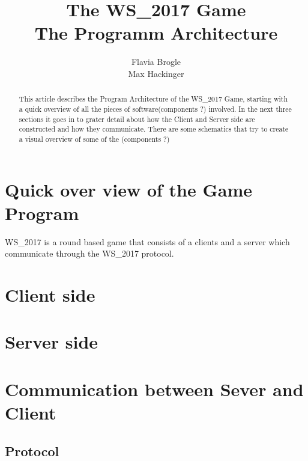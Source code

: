 \documentclass[11pt,a4paper]{article}
\title{The WS\_2017 Game \\ The Programm Architecture}
\author{Flavia Brogle \\ Max Hackinger}
\begin{document}
	\maketitle
  \tableofcontents
  
\begin{abstract}
  This article describes the Program Architecture of the WS\_2017 Game, starting with a quick overview of all the pieces of software(components ?) involved. In the next three sections it goes in to grater detail about how the Client and Server side are constructed and how they communicate. There are some schematics that try to create a visual overview of some of the (components ?) 
\end{abstract}  
  \clearpage
	\section{Quick over view of the Game Program}
	  WS\_2017 is a round based game that consists of a clients and a server which communicate through the WS\_2017 protocol.
		\subsection{}
		\subsection{}
		\subsection{}
	\clearpage
	\section{Client side}
		\subsection{}
		\subsection{}
		\subsection{} 
	\clearpage
	\section{Server side}
		\subsection{}
		\subsection{}
		\subsection{}
	\clearpage
	\section{Communication between Sever and Client}
		\subsection{Protocol}
\end{document}
